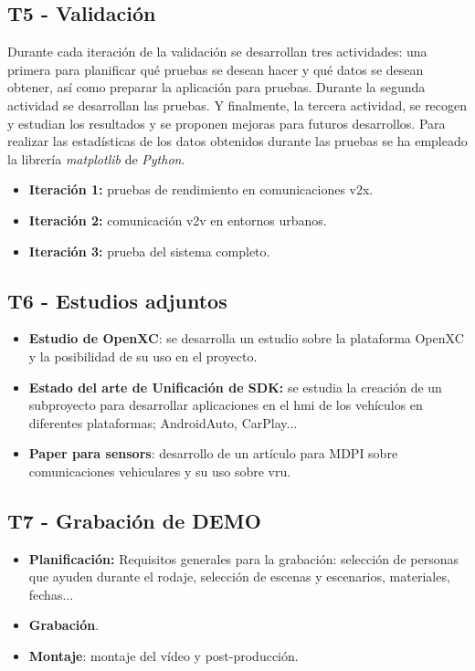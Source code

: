 \subsection{T5 - Validación}
Durante cada iteración de la validación se desarrollan tres actividades: una
primera para planificar qué pruebas se desean hacer y qué datos se desean obtener,
así como preparar la aplicación para pruebas. Durante la segunda actividad se
desarrollan las pruebas. Y finalmente, la tercera actividad, se recogen y estudian
los resultados y se proponen mejoras para futuros desarrollos. Para realizar las 
estadísticas de los datos obtenidos durante las pruebas se ha empleado la librería
\emph{matplotlib} de \emph{Python}.
\begin{itemize}
	\item \textbf{Iteración 1:} pruebas de rendimiento en comunicaciones \gls{v2x}.

	\item \textbf{Iteración 2:} comunicación \gls{v2v} en entornos urbanos.

	\item \textbf{Iteración 3:} prueba del sistema completo.
\end{itemize}

\subsection{T6 - Estudios adjuntos}
\begin{itemize}
	\item \textbf{Estudio de OpenXC}: se desarrolla un estudio sobre la plataforma
	OpenXC y la posibilidad de su uso en el proyecto.

	\item \textbf{Estado del arte de Unificación de SDK:} se estudia la creación de
	un subproyecto para	desarrollar aplicaciones en el \gls{hmi} de los vehículos en
	diferentes plataformas; AndroidAuto, CarPlay...

	\item \textbf{Paper para sensors}: desarrollo de un artículo para MDPI sobre
	comunicaciones vehiculares y su uso sobre \gls{vru}.
\end{itemize}

\subsection{T7 - Grabación de DEMO}
\begin{itemize}
	\item \textbf{Planificación:} Requisitos generales para la grabación: selección
	de personas que ayuden durante el rodaje, selección de escenas y escenarios,
	materiales, fechas...

	\item \textbf{Grabación}.

	\item \textbf{Montaje}: montaje del vídeo y post-producción.
\end{itemize}
